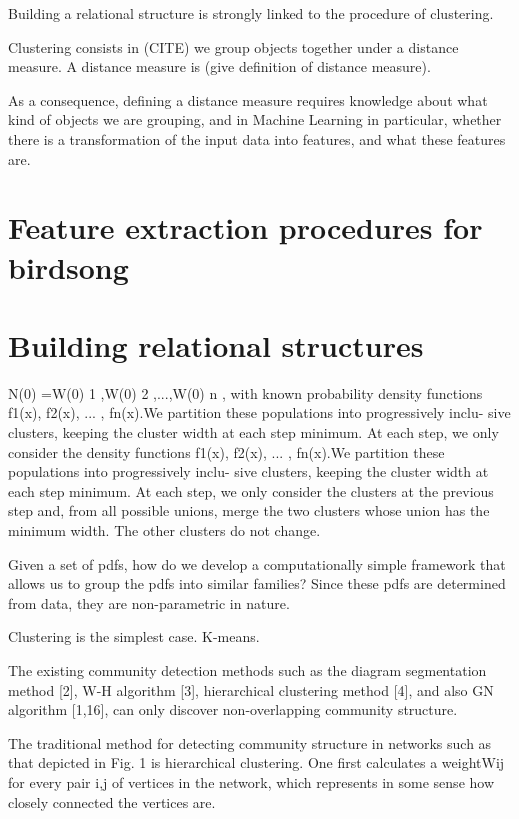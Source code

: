 \documentclass[../main.tex]{subfiles}
\begin{document}
Building a relational structure is strongly linked to the procedure of clustering. 


Clustering consists in (CITE) we group objects together under a distance measure. A distance measure is (give definition of distance measure).
\par As a consequence, defining a distance measure requires knowledge about what kind of objects we are grouping, and in Machine Learning in particular, whether there is a transformation of the input data into features, and what these features are.



\section{Feature extraction procedures for birdsong}
\section{Building relational structures}

\cite{VoVan2010}
N(0) ={W(0)
1 ,W(0) 2 ,...,W(0) n }, with known probability
density functions {f1(x), f2(x), ... , fn(x)}.We partition these populations into progressively inclu- sive clusters, keeping the cluster width at each step minimum. At each step, we only consider the
density functions {f1(x), f2(x), ... , fn(x)}.We partition these populations into progressively inclu- sive clusters, keeping the cluster width at each step minimum. At each step, we only consider the
clusters at the previous step and, from all possible unions, merge the two clusters whose union
has the minimum width. The other clusters do not change.

\cite{Goh2008}
Given a set of pdfs, how do
we develop a computationally simple framework that allows us to group the pdfs into
similar families? Since these pdfs are determined from data, they are non-parametric in
nature.

\cite{hastie2008}
Clustering is the simplest case. K-means. 

\cite{Lu2012}
    The existing community detection methods such as the
diagram segmentation method [2], W-H algorithm [3], hierarchical clustering method [4], and also GN algorithm [1,16], can
only discover non-overlapping community
structure.


\cite{Girvan2002}
The traditional method for detecting community structure in networks such as that depicted in Fig. 1 is
hierarchical clustering. One first calculates a weightWij for every
pair i,j of vertices in the network, which represents in some sense
how closely connected the vertices are.
\end{document}

